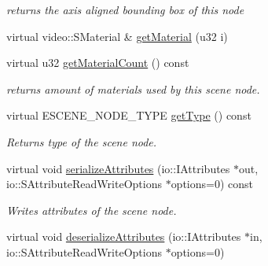 \begin{DoxyCompactItemize}
\begin{DoxyCompactList}\small\item\em returns the axis aligned bounding box of this node \end{DoxyCompactList}\item 
virtual video\-::\-S\-Material \& \hyperlink{classirr_1_1scene_1_1_c_sphere_scene_node_a4947f5c93a4bec42f3203d97cb76a708}{get\-Material} (u32 i)
\item 
\hypertarget{classirr_1_1scene_1_1_c_sphere_scene_node_aaf98cde44ae0695c892d27e710c848ce}{virtual u32 \hyperlink{classirr_1_1scene_1_1_c_sphere_scene_node_aaf98cde44ae0695c892d27e710c848ce}{get\-Material\-Count} () const }\label{classirr_1_1scene_1_1_c_sphere_scene_node_aaf98cde44ae0695c892d27e710c848ce}

\begin{DoxyCompactList}\small\item\em returns amount of materials used by this scene node. \end{DoxyCompactList}\item 
\hypertarget{classirr_1_1scene_1_1_c_sphere_scene_node_a753839c62739d087c9548dac20e5767f}{virtual E\-S\-C\-E\-N\-E\-\_\-\-N\-O\-D\-E\-\_\-\-T\-Y\-P\-E \hyperlink{classirr_1_1scene_1_1_c_sphere_scene_node_a753839c62739d087c9548dac20e5767f}{get\-Type} () const }\label{classirr_1_1scene_1_1_c_sphere_scene_node_a753839c62739d087c9548dac20e5767f}

\begin{DoxyCompactList}\small\item\em Returns type of the scene node. \end{DoxyCompactList}\item 
\hypertarget{classirr_1_1scene_1_1_c_sphere_scene_node_a6140a663ea8c73671c86969938417640}{virtual void \hyperlink{classirr_1_1scene_1_1_c_sphere_scene_node_a6140a663ea8c73671c86969938417640}{serialize\-Attributes} (io\-::\-I\-Attributes $\ast$out, io\-::\-S\-Attribute\-Read\-Write\-Options $\ast$options=0) const }\label{classirr_1_1scene_1_1_c_sphere_scene_node_a6140a663ea8c73671c86969938417640}

\begin{DoxyCompactList}\small\item\em Writes attributes of the scene node. \end{DoxyCompactList}\item 
\hypertarget{classirr_1_1scene_1_1_c_sphere_scene_node_a3045170efe6fa76fc5d362b8df7f2947}{virtual void \hyperlink{classirr_1_1scene_1_1_c_sphere_scene_node_a3045170efe6fa76fc5d362b8df7f2947}{deserialize\-Attributes} (io\-::\-I\-Attributes $\ast$in, io\-::\-S\-Attribute\-Read\-Write\-Options $\ast$options=0)}\label{classirr_1_1scene_1_1_c_sphere_scene_node_a3045170efe6fa76fc5d362b8df7f2947}


\end{DoxyCompactItemize}
